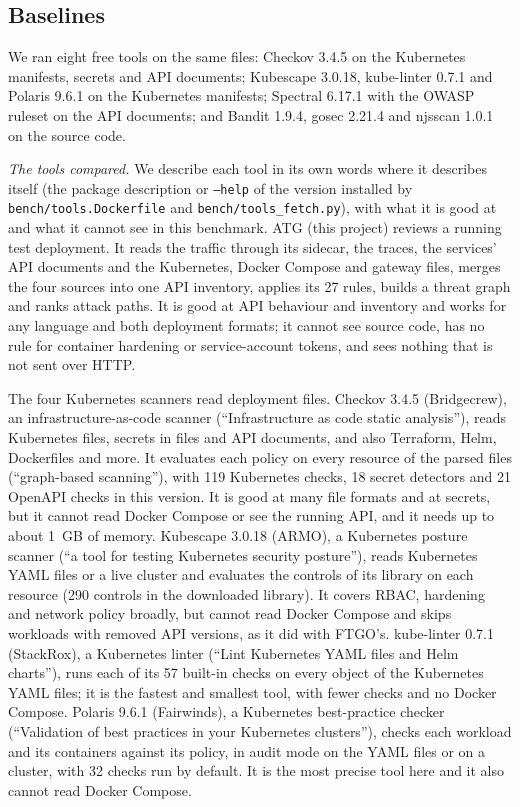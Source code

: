 \documentclass[conference]{IEEEtran}
\begin{document}
\subsection{Baselines}
We ran eight free tools on the same files: Checkov 3.4.5 on the Kubernetes manifests, secrets and API documents; Kubescape 3.0.18, kube-linter 0.7.1 and Polaris 9.6.1 on the Kubernetes manifests; Spectral 6.17.1 with the OWASP ruleset on the API documents; and Bandit 1.9.4, gosec 2.21.4 and njsscan 1.0.1 on the source code.

\textit{The tools compared.} We describe each tool in its own words where it describes itself (the package description or \texttt{--help} of the version installed by \texttt{bench/tools.Dockerfile} and \texttt{bench/tools\_fetch.py}), with what it is good at and what it cannot see in this benchmark. ATG (this project) reviews a running test deployment. It reads the traffic through its sidecar, the traces, the services' API documents and the Kubernetes, Docker Compose and gateway files, merges the four sources into one API inventory, applies its 27 rules, builds a threat graph and ranks attack paths. It is good at API behaviour and inventory and works for any language and both deployment formats; it cannot see source code, has no rule for container hardening or service-account tokens, and sees nothing that is not sent over HTTP.

The four Kubernetes scanners read deployment files. Checkov 3.4.5 (Bridgecrew), an infrastructure-as-code scanner (``Infrastructure as code static analysis''), reads Kubernetes files, secrets in files and API documents, and also Terraform, Helm, Dockerfiles and more. It evaluates each policy on every resource of the parsed files (``graph-based scanning''), with 119 Kubernetes checks, 18 secret detectors and 21 OpenAPI checks in this version. It is good at many file formats and at secrets, but it cannot read Docker Compose or see the running API, and it needs up to about 1~GB of memory. Kubescape 3.0.18 (ARMO), a Kubernetes posture scanner (``a tool for testing Kubernetes security posture''), reads Kubernetes YAML files or a live cluster and evaluates the controls of its library on each resource (290 controls in the downloaded library). It covers RBAC, hardening and network policy broadly, but cannot read Docker Compose and skips workloads with removed API versions, as it did with FTGO's. kube-linter 0.7.1 (StackRox), a Kubernetes linter (``Lint Kubernetes YAML files and Helm charts''), runs each of its 57 built-in checks on every object of the Kubernetes YAML files; it is the fastest and smallest tool, with fewer checks and no Docker Compose. Polaris 9.6.1 (Fairwinds), a Kubernetes best-practice checker (``Validation of best practices in your Kubernetes clusters''), checks each workload and its containers against its policy, in audit mode on the YAML files or on a cluster, with 32 checks run by default. It is the most precise tool here and it also cannot read Docker Compose.
\end{document}
